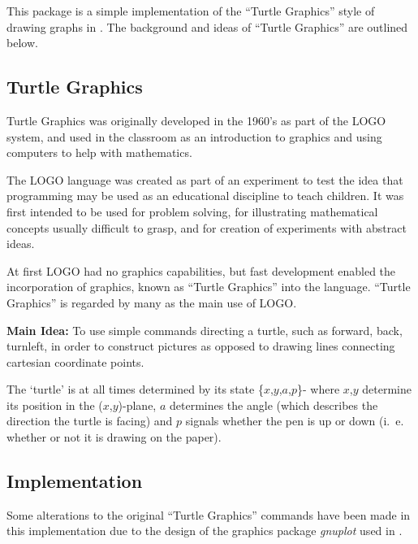 
\newcommand{\turtlesyntax}[1]{\textsl{SYNTAX: } \texttt{#1}}
\newcommand{\turtleabb}[1]{\textsl{Abbreviated form: } \texttt{#1}}

This package is a simple implementation of the ``Turtle Graphics''
style of drawing graphs in {\REDUCE}. The background and ideas of
``Turtle Graphics'' are outlined below.

\subsection{Turtle Graphics}

Turtle Graphics was originally developed in the 1960's as part of the
LOGO system, and used in the classroom as an introduction to graphics
and using computers to help with mathematics.

The LOGO language was created as part of an experiment to test the idea
that programming may be used as an educational discipline to teach children.
It was first intended to be used for problem solving, for illustrating
mathematical concepts usually difficult to grasp, and for creation of
experiments with abstract ideas.

At first LOGO had no graphics capabilities, but fast development enabled
the incorporation of graphics, known as ``Turtle Graphics'' into the
language. ``Turtle Graphics'' is regarded by many as the main use of
LOGO.


\textbf{Main Idea: } To use simple commands directing a turtle, such as
forward, back, turnleft, in order to construct pictures as opposed to
drawing lines connecting cartesian coordinate points.

The `turtle' is at all times determined by its state \{$x$,$y$,$a$,$p$\}-
where $x$,$y$ determine its position in the \mbox{($x$,$y$)-plane}, $a$
determines the angle (which describes the direction the turtle is
facing) and $p$ signals whether the pen is up or down (i.~e.~  whether or
not it is drawing on the paper).


\subsection{Implementation}
Some alterations to the original ``Turtle Graphics'' commands have been
made in this implementation due to the design of the graphics package
\emph{gnuplot} used in {\REDUCE}.

